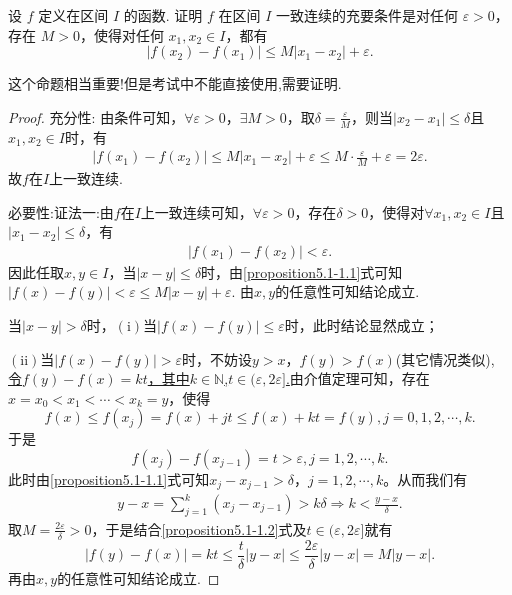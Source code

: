 \documentclass[../../main.tex]{subfiles}%
\begin{document}
\begin{proposition}[一致连续与Lipschitz连续的关系]\label{proposition:一致连续的充要条件-一致连续与Lipschitz连续的关系}
设 \(f\) 定义在区间 \(I\) 的函数. 证明 \(f\) 在区间 \(I\) 一致连续的充要条件是对任何 \(\varepsilon>0\)，存在 \(M > 0\)，使得对任何 \(x_1,x_2\in I\)，都有
\[|f(x_2)-f(x_1)|\leqslant  M|x_1 - x_2|+\varepsilon. \]
\end{proposition}
\begin{remark}
这个命题相当重要!但是考试中不能直接使用,需要证明.
\end{remark}
\begin{proof}

{\heiti 充分性:} 由条件可知，\(\forall \varepsilon >0\)，\(\exists M>0\)，取\(\delta =\frac{\varepsilon}{M}\)，则当\(\vert x_2 - x_1\vert\leqslant \delta\)且$x_1,x_2\in I$时，有
\begin{align*}
\vert f(x_1) - f(x_2)\vert \leqslant M\vert x_1 - x_2\vert+\varepsilon
\leqslant M\cdot\frac{\varepsilon}{M}+\varepsilon
= 2\varepsilon.
\end{align*}
故\(f\)在\(I\)上一致连续. 

{\heiti 必要性:}{\color{blue}证法一:}由\(f\)在\(I\)上一致连续可知，\(\forall \varepsilon >0\)，存在\(\delta >0\)，使得对\(\forall x_1,x_2\in I\)且\(\vert x_1 - x_2\vert\leqslant \delta\)，有
\begin{align}
\vert f(x_1) - f(x_2)\vert<\varepsilon. \label{proposition5.1-1.1}
\end{align}
因此任取\(x,y\in I\)，{\large {}}当\(\vert x - y\vert\leqslant \delta\)时，由\eqref{proposition5.1-1.1}式可知
\(
\vert f(x) - f(y)\vert<\varepsilon \leqslant M\vert x - y\vert+\varepsilon.
\)
由\(x,y\)的任意性可知结论成立.

{\large {}}当\(\vert x - y\vert>\delta\)时，\((\mathrm{i})\)当\(\vert f(x) - f(y)\vert\leqslant \varepsilon\)时，此时结论显然成立；

\((\mathrm{ii})\)当\(\vert f(x) - f(y)\vert>\varepsilon\)时，不妨设\(y > x\)，\(f(y) > f(x)\)(其它情况类似),
\hyperlink{k,t的存在性}{令\(f(y) - f(x) = kt\)，其中\(k\in \mathbb{N}\),\(t\in (\varepsilon,2\varepsilon]\).}由介值定理可知，存在\(x = x_0<x_1<\cdots <x_k = y\)，使得
\[
f(x) \leqslant f(x_j) = f(x) + jt\leqslant f(x) + kt = f(y), j = 0,1,2,\cdots,k.
\]
于是
\[
f(x_j) - f(x_{j - 1}) = t>\varepsilon, j = 1,2,\cdots,k.
\]
此时由\eqref{proposition5.1-1.1}式可知\(x_j - x_{j - 1}>\delta\)，\(j = 1,2,\cdots,k\)。从而我们有
\begin{align}
y - x=\sum_{j = 1}^k{(x_j - x_{j - 1})}>k\delta \Rightarrow k<\frac{y - x}{\delta}. \label{proposition5.1-1.2}  
\end{align}
取\(M = \frac{2\varepsilon}{\delta}>0\)，于是结合\eqref{proposition5.1-1.2}式及\(t\in (\varepsilon,2\varepsilon]\)就有
\[
\vert f(y) - f(x)\vert=kt\leqslant \frac{t}{\delta}\vert y - x\vert\leqslant \frac{2\varepsilon}{\delta}\vert y - x\vert=M\vert y - x\vert.
\]再由\(x,y\)的任意性可知结论成立.


\end{proof}
\end{document}
